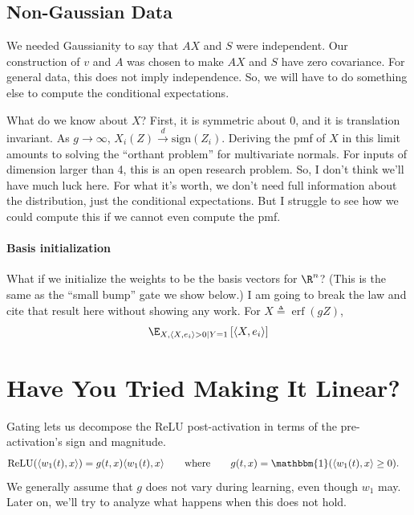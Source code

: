 \documentclass{article}
\begin{document}
\subsection*{Non-Gaussian Data}
We needed Gaussianity to say that $A X$ and $S$ were independent.
Our construction of $v$ and $A$ was chosen to make $A X$ and $S$ have zero covariance.
For general data, this does not imply independence.
So, we will have to do something else to compute the conditional expectations.

What do we know about $X$?
First, it is symmetric about 0, and it is translation invariant.
As $g \to \infty$, $X_i(Z) \overset{d}{\to} \text{sign}(Z_i)$.
Deriving the pmf of $X$ in this limit amounts to solving the ``orthant problem'' for multivariate normals.
For inputs of dimension larger than 4, this is an open research problem.
So, I don't think we'll have much luck here.
For what it's worth, we don't need full information about the distribution, just the conditional expectations.
But I struggle to see how we could compute this if we cannot even compute the pmf.

\paragraph*{Basis initialization}
What if we initialize the weights to be the basis vectors for $\R^n$?
(This is the same as the ``small bump'' gate we show below.)
I am going to break the law and cite that result here without showing any work.
For $X \triangleq \operatorname{erf}(g Z)$,
\begin{align}
  \E_{ X, \langle X, e_i \rangle > 0 \mid Y = 1 } \left[ \langle X, e_i \rangle \right] 
\end{align}


\section{Have You Tried Making It Linear?}

Gating lets us decompose the ReLU post-activation in terms of the pre-activation's sign and magnitude.
\begin{align}
  \text{ReLU}(\langle w_1(t), x \rangle)
  &= g(t, x) \langle w_1(t), x \rangle \qquad \text{where} \qquad g(t, x) = \mathbbm{1}( \langle w_1(t), x \rangle \geq 0 ). \label{eq:relu_gating}
\end{align}
We generally assume that $g$ does not vary during learning, even though $w_1$ may.
Later on, we'll try to analyze what happens when this does not hold.
\end{document}
